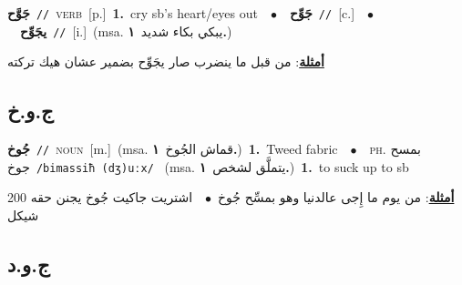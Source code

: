 \documentclass[10pt,a4paper,twoside]{article} %
\begin{document}
\begin{multicols}{2}
{\setlength\topsep{0pt}\textbf{\foreignlanguage{arabic}{جَوَّح}}\ {\color{gray}\texttt{//}\color{black}}\ \textsc{verb}\ [p.]\ \textbf{1.}~cry sb's heart/eyes out\ \ $\bullet$\ \ \setlength\topsep{0pt}\textbf{\foreignlanguage{arabic}{جَوِّح}}\ {\color{gray}\texttt{//}\color{black}}\ [c.]\ \ $\bullet$\ \ \setlength\topsep{0pt}\textbf{\foreignlanguage{arabic}{يجَوِّح}}\ {\color{gray}\texttt{//}\color{black}}\ [i.]\ \color{gray}(msa. \foreignlanguage{arabic}{يبكي بكاء شديد}~\foreignlanguage{arabic}{\textbf{١.}})\color{black}\  \begin{flushright}\color{gray}\foreignlanguage{arabic}{\textbf{\underline{\foreignlanguage{arabic}{أمثلة}}}: من قبل ما ينضرب صار يجَوِّح بضمير عشان هيك تركته}\end{flushright}\color{black}} \vspace{2mm}

\vspace{-3mm}
\subsection*{\color{blue}\foreignlanguage{arabic}{ج.و.خ}\color{blue}{}} 

{\setlength\topsep{0pt}\textbf{\foreignlanguage{arabic}{جُوخ}}\ {\color{gray}\texttt{//}\color{black}}\ \textsc{noun}\ [m.]\ \color{gray}(msa. \foreignlanguage{arabic}{قماش الجُوخ}~\foreignlanguage{arabic}{\textbf{١.}})\color{black}\ \textbf{1.}~Tweed fabric\ \ $\bullet$\ \ \textsc{ph.} \color{gray} \foreignlanguage{arabic}{بمسح جوخ}\color{black}\ {\color{gray}\texttt{/{\sffamily bimassiħ (dʒ)uːx}/}\color{black}}\ \color{gray} (msa. \foreignlanguage{arabic}{يتملَّق لشخص}~\foreignlanguage{arabic}{\textbf{١.}})\color{black}\ \textbf{1.}~to suck up to sb\  \begin{flushright}\color{gray}\foreignlanguage{arabic}{\textbf{\underline{\foreignlanguage{arabic}{أمثلة}}}: من يوم ما إِجى عالدنيا وهو بمسِّح جُوخ\ $\bullet$\ \  اشتريت جاكيت جُوخ يجنن حقه 200 شيكل}\end{flushright}\color{black}} \vspace{2mm}

\vspace{-3mm}
\subsection*{\color{blue}\foreignlanguage{arabic}{ج.و.د}\color{blue}{}} 


\end{multicols}
\end{document}
